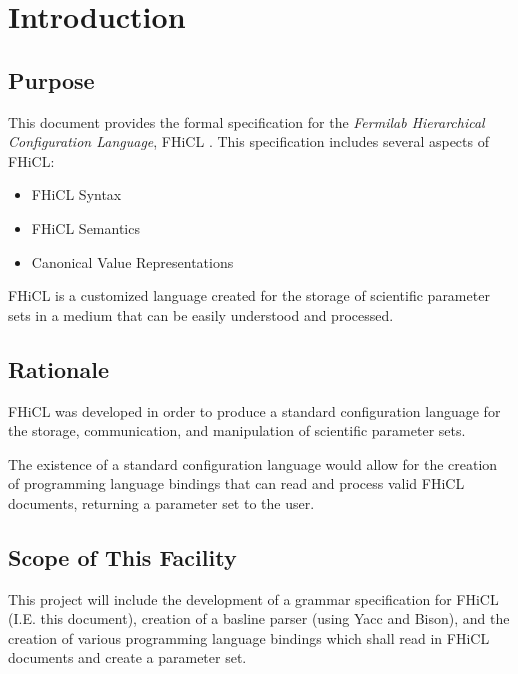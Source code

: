 \documentclass{memarticle}
\begin{document}
\topmatter
\newpage
\setlength{\parindent}{0in}

\chapter{Introduction}
        \section{Purpose}
        {
                This document provides the formal specification
                for the \emph{Fermilab Hierarchical Configuration Language}, FHiCL .
                This specification includes several aspects of FHiCL:
                \begin{itemize}
                        \item FHiCL Syntax
                        \item FHiCL Semantics
                        \item Canonical Value Representations
                \end{itemize}
                \par
                FHiCL is a customized language created for the storage of scientific parameter sets
                in a medium that can be easily understood and processed.
        }
        \section{Rationale}
        {
                FHiCL was developed in order to produce
                a standard configuration language for the storage,
                communication, 
                and manipulation
                of scientific parameter sets.
                \par
                The existence of a standard configuration language would allow for 
                the creation of programming language bindings that can read and process
                valid FHiCL documents, returning a parameter set to the user.
        }
        
        \section{Scope of This Facility}
        {
                This project will include the development of a grammar specification for FHiCL
                (I.E. this document), creation of a basline parser (using Yacc and Bison), and the
                creation of various programming language bindings which shall read in
                FHiCL documents and create a parameter set.
        }
        \newpage
\end{document}
